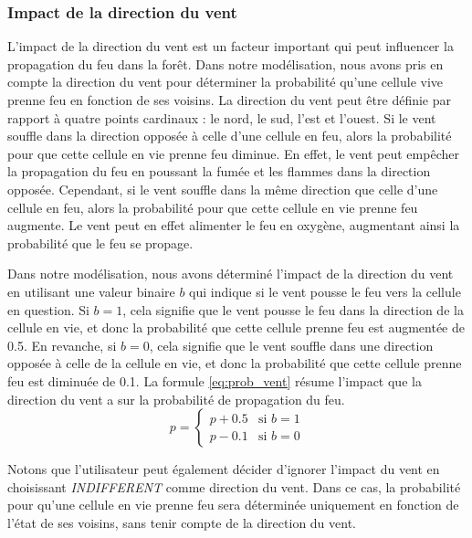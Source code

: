 \subsubsection{Impact de la direction du vent}

L'impact de la direction du vent est un facteur important qui peut influencer la propagation du feu dans la forêt. Dans notre modélisation, nous avons pris en compte la direction du vent pour déterminer la probabilité qu'une cellule vive prenne feu en fonction de ses voisins. La direction du vent peut être définie par rapport à quatre points cardinaux : le nord, le sud, l'est et l'ouest. Si le vent souffle dans la direction opposée à celle d'une cellule en feu, alors la probabilité pour que cette cellule en vie prenne feu diminue. En effet, le vent peut empêcher la propagation du feu en poussant la fumée et les flammes dans la direction opposée. Cependant, si le vent souffle dans la même direction que celle d'une cellule en feu, alors la probabilité pour que cette cellule en vie prenne feu augmente. Le vent peut en effet alimenter le feu en oxygène, augmentant ainsi la probabilité que le feu se propage.

Dans notre modélisation, nous avons déterminé l'impact de la direction du vent en utilisant une valeur binaire $b$ qui indique si le vent pousse le feu vers la cellule en question. Si $b=1$, cela signifie que le vent pousse le feu dans la direction de la cellule en vie, et donc la probabilité que cette cellule prenne feu est augmentée de 0.5. En revanche, si $b=0$, cela signifie que le vent souffle dans une direction opposée à celle de la cellule en vie, et donc la probabilité que cette cellule prenne feu est diminuée de 0.1. La formule \ref{eq:prob_vent} résume l’impact que la direction du vent a sur la probabilité de propagation du feu.
\begin{equation}
    p = \begin{cases}
    p + 0.5 & \text{si } b = 1 \\
    p - 0.1 & \text{si } b = 0
    \end{cases}
    \label{eq:prob_vent}
\end{equation}

Notons que l'utilisateur peut également décider d'ignorer l'impact du vent en choisissant \textit{INDIFFERENT} comme direction du vent. Dans ce cas, la probabilité pour qu'une cellule en vie prenne feu sera déterminée uniquement en fonction de l'état de ses voisins, sans tenir compte de la direction du vent.

